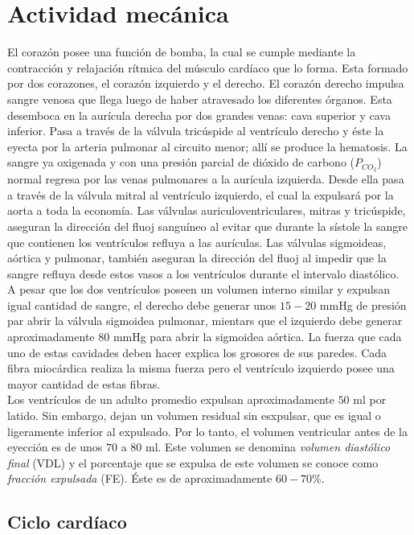 \section{Actividad mecánica}

El corazón posee una función de bomba, la cual se cumple mediante la contracción y relajación rítmica del músculo
cardíaco que lo forma. Esta formado por dos corazones, el corazón izquierdo y el derecho. El corazón derecho impulsa
sangre venosa que llega luego de haber atravesado los diferentes órganos. Esta desemboca en la aurícula derecha por
dos grandes venas: cava superior y cava inferior. Pasa a través de la válvula tricúspide al ventrículo derecho y
éste la eyecta por la arteria pulmonar al circuito menor; allí se produce la hematosis. La sangre ya oxigenada y con
una presión parcial de dióxido de carbono ($P_{CO_2}$) normal regresa por las venas pulmonares a la aurícula
izquierda. Desde ella pasa a través de la válvula mitral al ventrículo izquierdo, el cual la expulsará por la aorta
a toda la economía. Las válvulas auriculoventriculares, mitras y tricúspide, aseguran la dirección del fluoj
sanguíneo al evitar que durante la sístole la sangre que contienen los ventrículos refluya a las aurículas. Las
válvulas sigmoideas, aórtica y pulmonar, también aseguran la dirección del fluoj al impedir que la sangre refluya
desde estos vasos a los ventrículos durante el intervalo diastólico. \\
\indent A pesar que los dos ventrículos poseen un volumen interno similar y expulsan igual cantidad de sangre, el
derecho debe generar unos $15-20$ mmHg de presión par abrir la válvula sigmoidea pulmonar, mientars que el izquierdo
debe generar aproximadamente $80$ mmHg para abrir la sigmoidea aórtica. La fuerza que cada uno de estas cavidades
deben hacer explica los grosores de sus paredes. Cada fibra miocárdica realiza la misma fuerza pero el ventrículo
izquierdo posee una mayor cantidad de estas fibras. \\
\indent Los ventrículos de un adulto promedio expulsan aproximadamente $50$ ml por latido. Sin embargo, dejan un
volumen residual sin esxpulsar, que es igual o ligeramente inferior al expulsado. Por lo tanto, el volumen
ventricular antes de la eyección es de unos $70$ a $80$ ml. Este volumen se denomina \textit{volumen diastólico
final} (VDL) y el porcentaje que se expulsa de este volumen se conoce como \textit{fracción expulsada} (FE). Éste es
de aproximadamente $60-70\%$.

\subsection*{Ciclo cardíaco}

